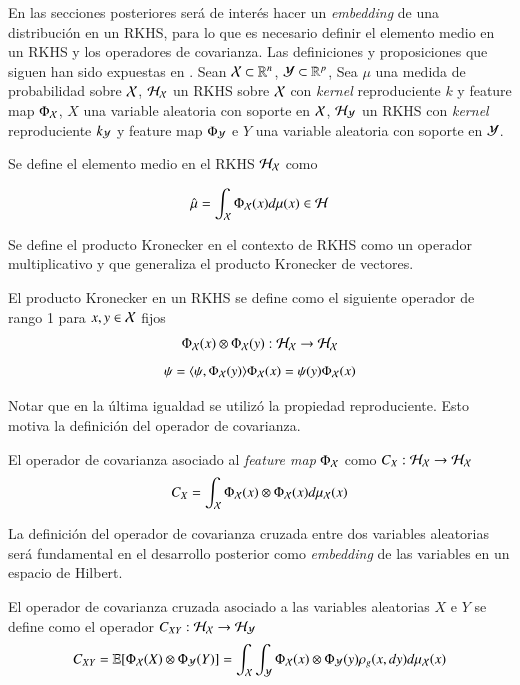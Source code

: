 En las secciones posteriores será de interés hacer un \textit{embedding} de una distribución en un RKHS, para lo que es necesario definir el elemento medio en un RKHS y los operadores de covarianza. Las definiciones y proposiciones que siguen han sido expuestas en \cite{Fukumizu2004DimensionalitySpaces, Song2009HilbertSystems, Muandet2017KernelBeyond}. Sean $\mathcal{X} \subset \mathbb{R}^n$, $\mathcal{Y} \subset \mathbb{R}^p$,  Sea $\mu$ una medida de probabilidad sobre $\mathcal{X}$, $\mathcal{H}_{\mathcal{X}}$ un RKHS sobre $\mathcal{X}$ con \textit{kernel} reproduciente $k$ y feature map $\Phi_{\mathcal{X}}$, $X$ una variable aleatoria con soporte en $\mathcal{X}$, $\mathcal{H}_{\mathcal{Y}}$ un RKHS con \textit{kernel} reproduciente $k_{\mathcal{Y}}$ y feature map $\Phi_{\mathcal{Y}}$ e $Y$ una variable aleatoria con soporte en $\mathcal{Y}$.
\begin{defn}
	Se define el elemento medio en el RKHS $\mathcal{H}_{\mathcal{X}}$ como
	
	\begin{equation*}
		\hat \mu = \int_{\mathcal{X}} \Phi_{\mathcal{X}} (x) d \mu (x) \in \mathcal{H}
	\end{equation*}
\end{defn}
Se define el producto Kronecker en el contexto de RKHS como un operador multiplicativo y que generaliza el producto Kronecker de vectores.
\begin{defn}
    El producto Kronecker en un RKHS se define como
    el siguiente operador de rango 1 para $x, y \in \mathcal{X}$ fijos
	$$ \Phi_{\mathcal{X}} (x) \otimes \Phi_{\mathcal{X}}(y) : \mathcal{H}_{\mathcal{X}} \to \mathcal{H}_{\mathcal{X}}$$
	\begin{equation*}
		[\Phi_\X (x) \otimes \Phi_\X(y)] \psi = \langle \psi, \Phi_\X (y) \rangle \Phi_\X (x) = \psi (y) \Phi_\X (x)
	\end{equation*}
    \label{def:kronecker}
\end{defn}
Notar que en la última igualdad se utilizó la propiedad reproduciente. Esto motiva la definición del operador de covarianza.
\begin{defn}
    El operador de covarianza asociado al \textit{feature map} $\Phi_{\mathcal{X}}$ como $C_X : \mathcal{H}_{\mathcal{X}} \to \mathcal{H}_{\mathcal{X}}$ 
    \begin{equation*}
        C_X = \int_{\mathcal{X}} \Phi_{\mathcal{X}} (x) \otimes \Phi_{\mathcal{X}} (x) d \mu_{\mathcal{X}} (x)
    \end{equation*}
\end{defn}
La definición del operador de covarianza cruzada entre dos variables aleatorias será fundamental en el desarrollo posterior como \textit{embedding} de las variables en un espacio de Hilbert.
\begin{defn}
    El operador de covarianza cruzada asociado a las variables aleatorias $X$ e $Y$ se define como el operador $C_{XY}: \mathcal{H}_{\mathcal{X}} \to \mathcal{H}_{\mathcal{Y}}$	
    \begin{equation*}
        C_{X Y} = \mathbb{E} [\Phi_{\mathcal{X}} (X) \otimes \Phi_{\mathcal{Y}} (Y)] = \int_{\mathcal{X}} \int_{\mathcal{Y}} \Phi_{\mathcal{X}} (x) \otimes \Phi_{\mathcal{Y}} (y) \rho_g (x, dy) d \mu_{\mathcal{X}} (x)
    \end{equation*}
\end{defn}

